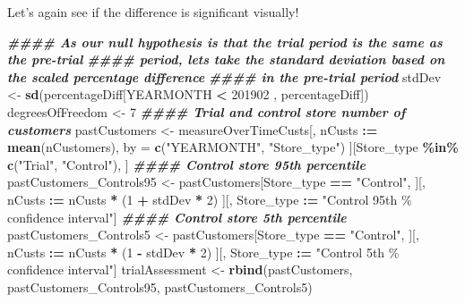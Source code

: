 \documentclass[
]{article}
\newenvironment{Shaded}{\begin{snugshade}}{\end{snugshade}}
\newcommand{\DecValTok}[1]{\textcolor[rgb]{0.00,0.00,0.81}{#1}}
\newcommand{\DocumentationTok}[1]{\textcolor[rgb]{0.56,0.35,0.01}{\textbf{\textit{#1}}}}
\newcommand{\FunctionTok}[1]{\textcolor[rgb]{0.13,0.29,0.53}{\textbf{#1}}}
\newcommand{\NormalTok}[1]{#1}
\newcommand{\OtherTok}[1]{\textcolor[rgb]{0.56,0.35,0.01}{#1}}
\newcommand{\SpecialCharTok}[1]{\textcolor[rgb]{0.81,0.36,0.00}{\textbf{#1}}}
\newcommand{\StringTok}[1]{\textcolor[rgb]{0.31,0.60,0.02}{#1}}
\begin{document}
Let's again see if the difference is significant visually!

\begin{Shaded}
\begin{Highlighting}[]
\DocumentationTok{\#\#\#\# As our null hypothesis is that the trial period is the same as the pre{-}trial }
\DocumentationTok{\#\#\#\# period, let\textquotesingle{}s take the standard deviation based on the scaled percentage difference}
\DocumentationTok{\#\#\#\# in the pre{-}trial period}
\NormalTok{stdDev }\OtherTok{\textless{}{-}} \FunctionTok{sd}\NormalTok{(percentageDiff[YEARMONTH }\SpecialCharTok{\textless{}} \DecValTok{201902}\NormalTok{ , percentageDiff])}
\NormalTok{degreesOfFreedom }\OtherTok{\textless{}{-}} \DecValTok{7}
\DocumentationTok{\#\#\#\# Trial and control store number of customers}
\NormalTok{pastCustomers }\OtherTok{\textless{}{-}}\NormalTok{ measureOverTimeCusts[, nCusts }\SpecialCharTok{:=} \FunctionTok{mean}\NormalTok{(nCustomers), by }\OtherTok{=}
\FunctionTok{c}\NormalTok{(}\StringTok{"YEARMONTH"}\NormalTok{, }\StringTok{"Store\_type"}\NormalTok{)}
\NormalTok{                            ][Store\_type }\SpecialCharTok{\%in\%} \FunctionTok{c}\NormalTok{(}\StringTok{"Trial"}\NormalTok{, }\StringTok{"Control"}\NormalTok{), ]}
\DocumentationTok{\#\#\#\# Control store 95th percentile}
\NormalTok{pastCustomers\_Controls95 }\OtherTok{\textless{}{-}}\NormalTok{ pastCustomers[Store\_type }\SpecialCharTok{==} \StringTok{"Control"}\NormalTok{,}
\NormalTok{                                ][, nCusts }\SpecialCharTok{:=}\NormalTok{ nCusts }\SpecialCharTok{*}\NormalTok{ (}\DecValTok{1} \SpecialCharTok{+}\NormalTok{ stdDev }\SpecialCharTok{*} \DecValTok{2}\NormalTok{)}
\NormalTok{                                ][, Store\_type }\SpecialCharTok{:=} \StringTok{"Control 95th \% confidence}
\StringTok{interval"}\NormalTok{]}
\DocumentationTok{\#\#\#\# Control store 5th percentile}
\NormalTok{pastCustomers\_Controls5 }\OtherTok{\textless{}{-}}\NormalTok{ pastCustomers[Store\_type }\SpecialCharTok{==} \StringTok{"Control"}\NormalTok{,}
\NormalTok{                                ][, nCusts }\SpecialCharTok{:=}\NormalTok{ nCusts }\SpecialCharTok{*}\NormalTok{ (}\DecValTok{1} \SpecialCharTok{{-}}\NormalTok{ stdDev }\SpecialCharTok{*} \DecValTok{2}\NormalTok{)}
\NormalTok{                                ][, Store\_type }\SpecialCharTok{:=} \StringTok{"Control 5th \% confidence}
\StringTok{interval"}\NormalTok{]}
\NormalTok{trialAssessment }\OtherTok{\textless{}{-}} \FunctionTok{rbind}\NormalTok{(pastCustomers, pastCustomers\_Controls95,}
\NormalTok{pastCustomers\_Controls5)}

\end{Highlighting}
\end{Shaded}
\end{document}
